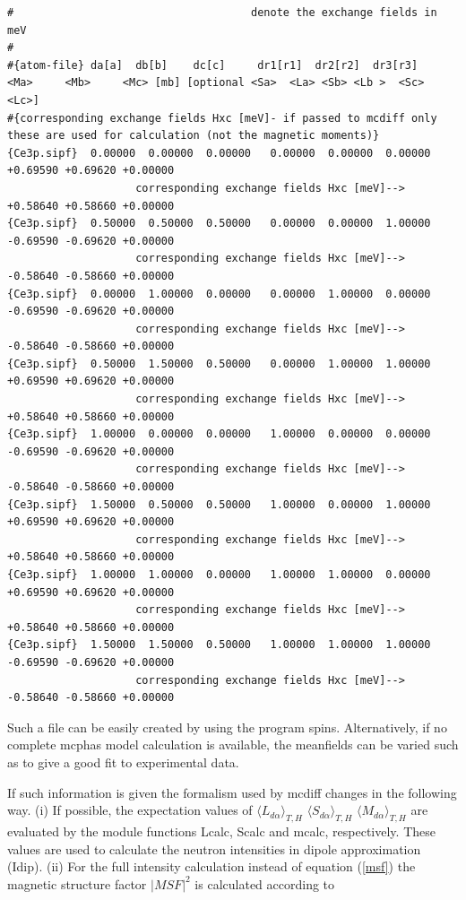 {\begin{verbatim}
#                                     denote the exchange fields in meV 
#
#{atom-file} da[a]  db[b]    dc[c]     dr1[r1]  dr2[r2]  dr3[r3]   <Ma>     <Mb>     <Mc> [mb] [optional <Sa>  <La> <Sb> <Lb >  <Sc> <Lc>] 
#{corresponding exchange fields Hxc [meV]- if passed to mcdiff only these are used for calculation (not the magnetic moments)}
{Ce3p.sipf}  0.00000  0.00000  0.00000   0.00000  0.00000  0.00000   +0.69590 +0.69620 +0.00000  
                    corresponding exchange fields Hxc [meV]--> +0.58640 +0.58660 +0.00000
{Ce3p.sipf}  0.50000  0.50000  0.50000   0.00000  0.00000  1.00000   -0.69590 -0.69620 +0.00000 
                    corresponding exchange fields Hxc [meV]--> -0.58640 -0.58660 +0.00000
{Ce3p.sipf}  0.00000  1.00000  0.00000   0.00000  1.00000  0.00000   -0.69590 -0.69620 +0.00000 
                    corresponding exchange fields Hxc [meV]--> -0.58640 -0.58660 +0.00000
{Ce3p.sipf}  0.50000  1.50000  0.50000   0.00000  1.00000  1.00000   +0.69590 +0.69620 +0.00000 
                    corresponding exchange fields Hxc [meV]--> +0.58640 +0.58660 +0.00000
{Ce3p.sipf}  1.00000  0.00000  0.00000   1.00000  0.00000  0.00000   -0.69590 -0.69620 +0.00000 
                    corresponding exchange fields Hxc [meV]--> -0.58640 -0.58660 +0.00000
{Ce3p.sipf}  1.50000  0.50000  0.50000   1.00000  0.00000  1.00000   +0.69590 +0.69620 +0.00000 
                    corresponding exchange fields Hxc [meV]--> +0.58640 +0.58660 +0.00000
{Ce3p.sipf}  1.00000  1.00000  0.00000   1.00000  1.00000  0.00000   +0.69590 +0.69620 +0.00000  
                    corresponding exchange fields Hxc [meV]--> +0.58640 +0.58660 +0.00000
{Ce3p.sipf}  1.50000  1.50000  0.50000   1.00000  1.00000  1.00000   -0.69590 -0.69620 +0.00000
                    corresponding exchange fields Hxc [meV]--> -0.58640 -0.58660 +0.00000

\end{verbatim}
}

Such a file can be easily created by using the program {\prg spins}. Alternatively, if no complete {\prg mcphas} model
calculation is available, the meanfields can be varied such as to
give a good fit to experimental data.

If such information is given the formalism used by {\prg mcdiff} changes in the following way. 
(i) If possible, the expectation values of  $\langle L_{d\alpha} \rangle_{T,H}$  $\langle S_{d\alpha} \rangle_{T,H}$    $\langle M_{d\alpha} \rangle_{T,H}$ are evaluated by the module functions {\prg Lcalc, Scalc and mcalc}, respectively. These values are used to calculate the neutron intensities in dipole approximation (Idip).
(ii) For the full intensity calculation instead of equation (\ref{msf}) the magnetic structure factor $|MSF|^2$ is calculated according to

